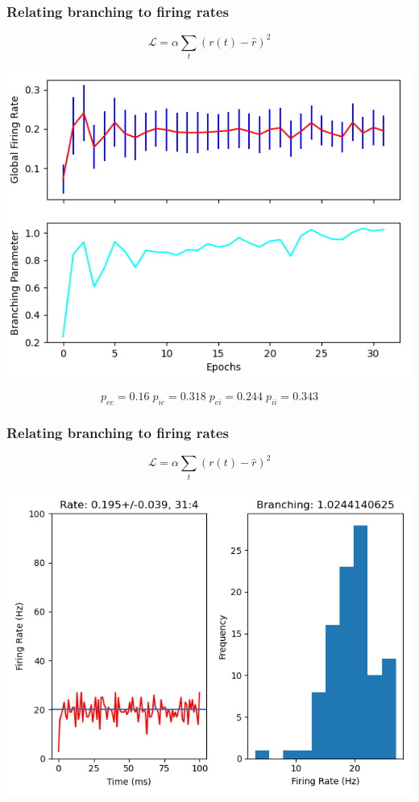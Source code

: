 \documentclass{beamer}
\begin{document}
\begin{frame}[plain]
\frametitle{Relating branching to firing rates} 


\begin{equation*}
\mathcal{L} = \alpha\sum_{t} (r(t) - \hat{r})^{2}
\end{equation*}

\begin{center}
\includegraphics[scale=0.5]{alpha-1ms-bin}
\end{center}

\begin{equation*}
p_{ee} = 0.16 \; p_{ie} = 0.318 \;  p_{ei} = 0.244 \; p_{ii} = 0.343
\end{equation*}

\end{frame}

\begin{frame}[plain]
\frametitle{Relating branching to firing rates}  

\begin{equation*}
\mathcal{L} = \alpha\sum_{t} (r(t) - \hat{r})^{2}
\end{equation*}

\begin{center}
\includegraphics[scale=0.5]{last-epoch}
\end{center}


\end{frame}
\end{document}
